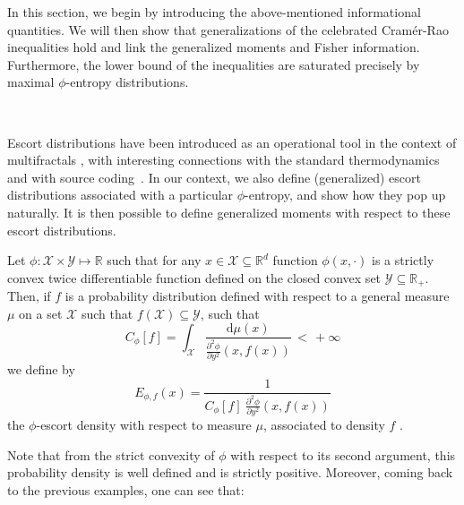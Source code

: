 \documentclass[entropy,article,submit,moreauthors,pdftex]{Definitions/mdpi}
\def\dmu{\mathrm{d}\mu}%
\def\Rset{\mathbb{R}}%
\def\X{\mathcal{X}}%
\def\Y{\mathcal{Y}}%
\begin{document}
In  this section,  we  begin by  introducing  the above-mentioned  informational
quantities.   We  will   then  show  that  generalizations   of  the  celebrated
Cram\'er-Rao  inequalities hold  and  link the  generalized  moments and  Fisher
information.  Furthermore,  the lower  bound of  the inequalities  are saturated
precisely by maximal $\phi$-entropy distributions.

\

Escort distributions have been introduced as  an operational tool in the context
of multifractals  \cite{ChhJen89, BecSch93},  with interesting  connections with
the  standard thermodynamics~\cite{Nau11}  and  with source  coding~\cite{Cam65,
  Ber09}.  In our  context, we  also define  (generalized) escort  distributions
associated with a particular $\phi$-entropy, and show how they pop up naturally.
It is then  possible to define generalized moments with  respect to these escort
distributions.


\begin{Definition}\label{def:phi-escort}
  Let $\phi: \X \times  \Y \mapsto \Rset$ such that for any  $x \in \X \subseteq
  \Rset^d$ function  $\phi(x,\cdot)$ is  a strictly convex  twice differentiable
  function defined  on the closed convex  set $\Y \subseteq \Rset_+$.   Then, if
  $f$ is  a probability distribution defined  with respect to a  general measure
  $\mu$ on a set $\X$ such that $f(\X) \subseteq \Y$, such that
  \begin{equation}
  \label{eq:Cphi}
  C_\phi[f] = \int_\X \frac{\dmu(x)}{\frac{\partial^2 \phi}{\partial
      y^2}(x,f(x))} \, < \, + \infty
  \end{equation}
  we define by
  \begin{equation}\label{eq:phi-escort}
  E_{\phi,f}(x) = \frac{1}{\displaystyle C_\phi[f] \: \frac{\partial^2
    \phi}{\partial y^2}(x,f(x))}
  \end{equation}
  the $\phi$-escort density with respect to measure $\mu$, associated to density
  $f$ .
\end{Definition}
%
Note  that from  the  strict convexity  of  $\phi$ with  respect  to its  second
argument,   this  probability   density  is   well  defined   and  is   strictly
positive. Moreover, coming back to the previous examples, one can see that:
\end{document}
